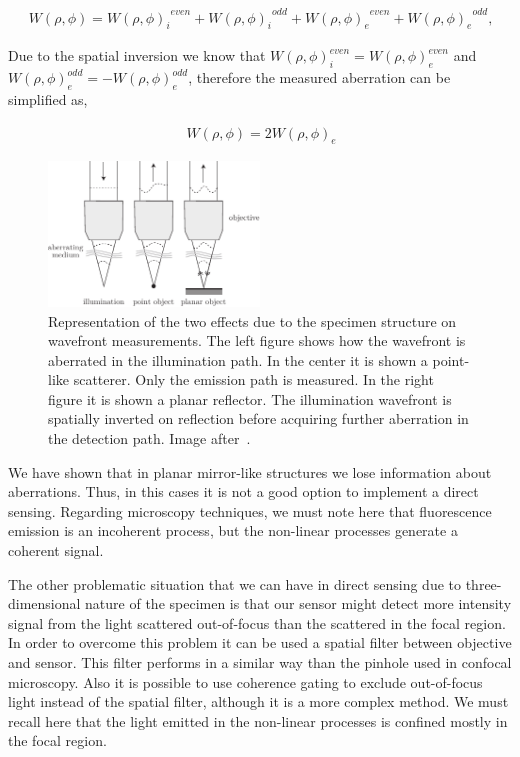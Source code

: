 \begin{align}
	\ W(\rho,\phi) = {{W(\rho,\phi)_i}^{even}} + {{W(\rho,\phi)_i}^{odd}}+{{W(\rho,\phi)_e}^{even}} + {{W(\rho,\phi)_e}^{odd}},
	\label{eq:aberration_sum_il_em}
\end{align}  

Due to the spatial inversion we know that $W(\rho,\phi)_i^{even}=W(\rho,\phi)_e^{even}$ and $W(\rho,\phi)_e^{odd}=-W(\rho,\phi)_e^{odd}$, therefore the measured aberration can be simplified as,  

\begin{align}
	\ W(\rho,\phi)=2 {{W(\rho,\phi)_e}}
	\label{eq:ab_measured_spat_inver}
\end{align} 
 

\begin{figure}[htbp]
	\centering
		\includegraphics[width=0.50\textwidth]{images/abe_direct_sensing}
	\caption{Representation of the two effects due to the specimen structure on wavefront measurements. The left figure shows how the wavefront is aberrated in the illumination path. In the center it is shown a point-like scatterer. Only the emission path is measured. In the right figure it is shown a planar reflector. The illumination wavefront is spatially inverted on reflection before acquiring further aberration in the detection path. Image after~\cite{AOM_basic_ref}.}
	\label{fig:abe_direct_sensing}
\end{figure}


We have shown that in planar mirror-like structures we lose information about aberrations. Thus, in this cases it is not a good option to implement a direct sensing. Regarding microscopy techniques, we must note here that fluorescence emission is an incoherent process, but the non-linear processes generate a coherent signal.

The other problematic situation that we can have in direct sensing due to three-dimensional nature of the specimen is that our sensor might detect more intensity signal from the light scattered out-of-focus than the scattered in the focal region. In order to overcome this problem it can be used a spatial filter between objective and sensor. This filter performs in a similar way than the pinhole used in confocal microscopy. Also it is possible to use coherence gating to exclude out-of-focus light instead of the spatial filter, although it is a more complex method. We must recall here that the light emitted in the non-linear processes is confined mostly in the focal region.

